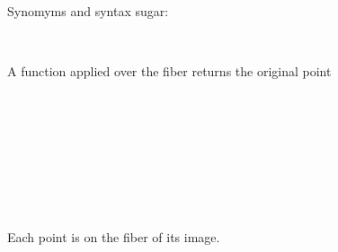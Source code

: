 Synomyms and syntax sugar:

\begin{code}%
%
\>[2]\AgdaSpace{}%
\AgdaSymbol{=}\AgdaSpace{}%
\<%
\\
%
\>[2]\AgdaSpace{}%
\AgdaSpace{}%
\AgdaSpace{}%
\AgdaSpace{}%
\AgdaSymbol{=}\AgdaSpace{}%
\AgdaSpace{}%
\AgdaFunction{//}\AgdaSpace{}%
\<%
\end{code}

A function applied over the fiber returns the original point

\begin{code}%
%
\>[2]\AgdaComment{}\<%
\\
%
\>[2]\<%
\\
\>[2][@{}l@{\AgdaIndent{0}}]%
\>[4]\AgdaSymbol{:}\AgdaSpace{}%
\AgdaSpace{}%
\AgdaSymbol{\{}\AgdaSpace{}%
\AgdaSymbol{:}\AgdaSpace{}%
\AgdaSpace{}%
\AgdaSpace{}%
\AgdaSymbol{\}}\AgdaSpace{}%
\AgdaSymbol{\{}\AgdaSpace{}%
\AgdaSymbol{:}\AgdaSpace{}%
\AgdaSymbol{\}}\<%
\\
%
\>[4]\AgdaSpace{}%
\AgdaSymbol{(}\AgdaSpace{}%
\AgdaSymbol{:}\AgdaSpace{}%
\AgdaSpace{}%
\AgdaSpace{}%
\AgdaSymbol{)}\<%
\\
%
\>[4]\AgdaComment{---------------}\<%
\\
%
\>[4]\AgdaSpace{}%
\AgdaSpace{}%
\AgdaSymbol{(}\AgdaSpace{}%
\AgdaSymbol{)}\AgdaSpace{}%
\AgdaOperator{\AgdaDatatype{==}}\AgdaSpace{}%
\<%
\\
%
\\[\AgdaEmptyExtraSkip]%
%
\>[2]\AgdaSpace{}%
\AgdaSymbol{(}\AgdaSpace{}%
\AgdaOperator{\AgdaInductiveConstructor{,}}\AgdaSpace{}%
\AgdaSymbol{)}\AgdaSpace{}%
\AgdaSymbol{=}\AgdaSpace{}%
\<%
\end{code}

Each point is on the fiber of its image.

